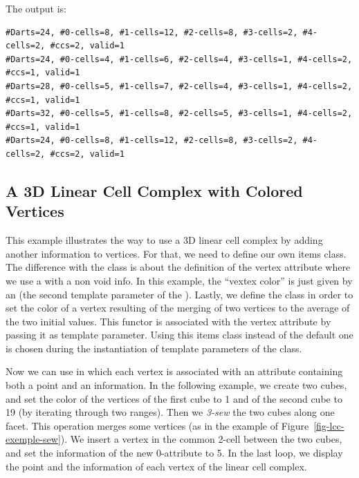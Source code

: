 
The output is:
\begin{verbatim}
#Darts=24, #0-cells=8, #1-cells=12, #2-cells=8, #3-cells=2, #4-cells=2, #ccs=2, valid=1
#Darts=24, #0-cells=4, #1-cells=6, #2-cells=4, #3-cells=1, #4-cells=2, #ccs=1, valid=1
#Darts=28, #0-cells=5, #1-cells=7, #2-cells=4, #3-cells=1, #4-cells=2, #ccs=1, valid=1
#Darts=32, #0-cells=5, #1-cells=8, #2-cells=5, #3-cells=1, #4-cells=2, #ccs=1, valid=1
#Darts=24, #0-cells=8, #1-cells=12, #2-cells=8, #3-cells=2, #4-cells=2, #ccs=2, valid=1
\end{verbatim}

\subsection{A 3D Linear Cell Complex with Colored Vertices}
\label{ssec-exemple-color-vertices}

This example illustrates the way to use a 3D linear cell complex by
adding another information to vertices. For that, we need to define
our own items class.  The difference with the
 class is about the definition of
the vertex attribute where we use a 
with a non void info. In this example, the ``vextex color'' is just
given by an  (the second template parameter of the
).  Lastly, we define the
 class in order to set the color of a vertex
resulting of the merging of two vertices to the average of the two
initial values. This functor is associated with the vertex attribute
by passing it as template parameter.  Using this items class instead of
the default one is chosen during the instantiation of template
parameters of the  class.

Now we can use  in which each vertex is associated with an
attribute containing both a point and an information. In the following
example, we create two cubes, and set the color of the vertices of the
first cube to 1 and of the second cube to 19 (by iterating through two
 ranges).  Then we
\emph{3-sew} the two cubes along one facet. This operation merges some
vertices (as in the example of Figure~\ref{fig-lcc-exemple-sew}).  We
insert a vertex in the common 2-cell between the two cubes, and set
the information of the new 0-attribute to 5.  In the last loop, we
display the point and the information of each vertex of the linear
cell complex.


